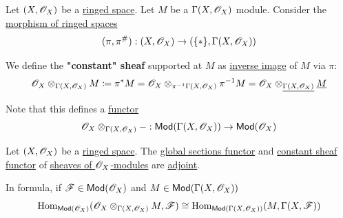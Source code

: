 \documentclass[../../../main]{subfiles}
\begin{document}
\begin{definition} \label{def:constant-sheaf-ox-mod}
  Let \((X, \mathscr{O}_{X})\) be a \hyperref[def:ringed-space]{ringed space}.
  Let \(M\) be a \(\Gamma(X, \mathscr{O}_{X})\) module.
  Consider the \hyperref[def:ringed-space]{morphism of ringed spaces}
  \begin{equation*}
    (\pi, \pi^{\#}): (X, \mathscr{O}_{X}) \to (\{\ast\}, \Gamma(X, \mathscr{O}_{X}))
  \end{equation*}
  
  We define the \textbf{"constant" sheaf} supported at \(M\) as \hyperref[def:inverse-image-ox-mod]{inverse image} of \(M\) via \(\pi\):
  \begin{equation*}
    \mathscr{O}_{X} \otimes_{\Gamma(X, \mathscr{O}_{X})} M \coloneq \pi^{\ast}M = \mathscr{O}_{X} \otimes_{\pi^{-1}\Gamma(X, \mathscr{O}_{X})} \pi^{-1}M = \mathscr{O}_{X} \otimes_{\underline{\Gamma(X, \mathscr{O}_{X})}} \underline{M}
  \end{equation*}

  Note that this defines a \hyperref[def:functor]{functor}
  \begin{equation*}
    \mathscr{O}_{X} \otimes_{\Gamma(X, \mathscr{O}_{X})} - : \mathsf{Mod}(\Gamma(X, \mathscr{O}_{X})) \to \mathsf{Mod}(\mathscr{O}_{X})
  \end{equation*}
\end{definition}

\begin{corollary} \label{cor:global-constant-adjunction-ox-mod}
  Let \((X, \mathscr{O}_{X})\) be a \hyperref[def:ringed-space]{ringed space}.
  The \hyperref[def:global-sections-ox-mod]{global sections functor} and \hyperref[def:constant-sheaf-ox-mod]{constant sheaf functor} of \hyperref[def:sheaf-of-modules]{sheaves of \(\mathscr{O}_{X}\)-modules} are \hyperref[def:adjoint-functors]{adjoint}.

  In formula, if \(\mathscr{F} \in \mathsf{Mod}(\mathscr{O}_{X})\) and \(M \in \mathsf{Mod}(\Gamma(X, \mathscr{O}_{X}))\)
  \begin{equation*}
    \operatorname{Hom}_{\mathsf{Mod}(\mathscr{O}_{X})}(\mathscr{O}_{X} \otimes_{\Gamma(X, \mathscr{O}_{X})} M, \mathscr{F}) \cong \operatorname{Hom}_{\mathsf{Mod}(\Gamma(X, \mathscr{O}_{X}))} (M, \Gamma(X, \mathscr{F}))
  \end{equation*}
\end{corollary}
\end{document}
